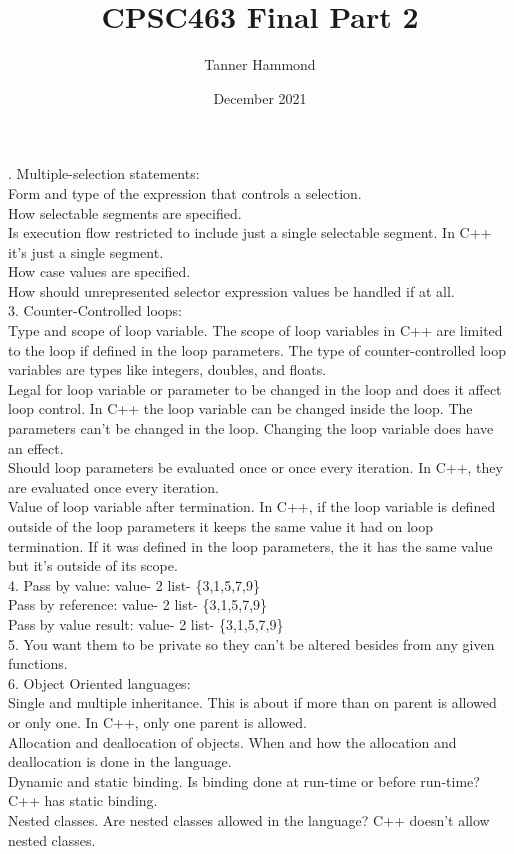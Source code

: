 \documentclass{article}
\title{CPSC463 Final Part 2}
\author{Tanner Hammond}
\date{December 2021}
\begin{document}
. Multiple-selection statements:\\
Form and type of the expression that controls a selection. \\
How selectable segments are specified. \\
Is execution flow restricted to include just a single selectable segment. In C++ it's just a single segment.\\
How case values are specified. \\
How should unrepresented selector expression values be handled if at all. \\

3. Counter-Controlled loops:\\
Type and scope of loop variable. The scope of loop variables in C++ are limited to the loop if defined in the loop parameters. The type of counter-controlled loop variables are types like integers, doubles, and floats.\\
Legal for loop variable or parameter to be changed in the loop and does it affect loop control. In C++ the loop variable can be changed inside the loop. The parameters can't be changed in the loop. Changing the loop variable does have an effect.\\
Should loop parameters be evaluated once or once every iteration. In C++, they are evaluated once every iteration.\\
Value of loop variable after termination. In C++, if the loop variable is defined outside of the loop parameters it keeps the same value it had on loop termination. If it was defined in the loop parameters, the it has the same value but it's outside of its scope.\\

4. Pass by value: value- 2 list- \{3,1,5,7,9\} \\
Pass by reference: value- 2 list- \{3,1,5,7,9\}\\
Pass by value result: value- 2 list- \{3,1,5,7,9\}\\

5. You want them to be private so they can't be altered besides from any given functions.\\

6. Object Oriented languages:\\
Single and multiple inheritance. This is about if more than on parent is allowed or only one. In C++, only one parent is allowed.\\
Allocation and deallocation of objects. When and how the allocation and deallocation is done in the language. \\
Dynamic and static binding. Is binding done at run-time or before run-time? C++ has static binding.\\
Nested classes. Are nested classes allowed in the language? C++ doesn't allow nested classes.\\
\end{document}

